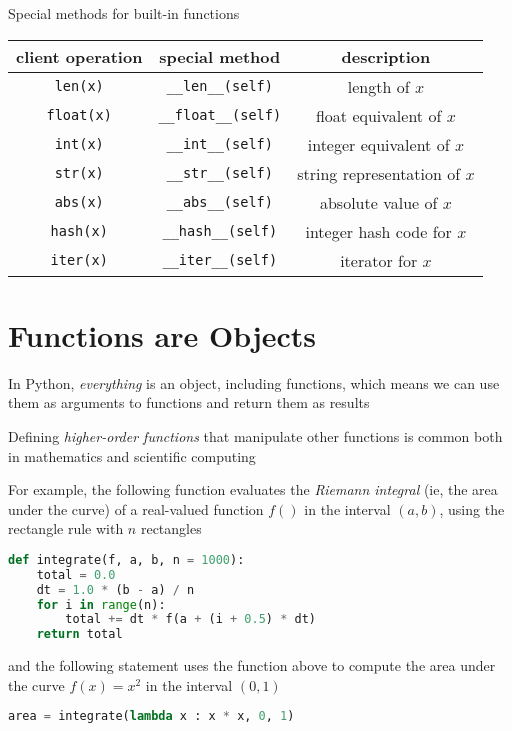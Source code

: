 \documentclass[8pt,a4paper,compress,handout]{beamer}
\begin{document}
\begin{frame}[fragile]
Special methods for built-in functions
\begin{center}
\begin{tabular}{ccc}
client operation & special method & description \\ \hline
\lstinline$len(x)$ & \lstinline$__len__(self)$ & length of $x$ \\
\lstinline$float(x)$ & \lstinline$__float__(self)$ & float equivalent of $x$ \\
\lstinline$int(x)$ & \lstinline$__int__(self)$ & integer equivalent of $x$ \\
\lstinline$str(x)$ & \lstinline$__str__(self)$ & string representation of $x$ \\
\lstinline$abs(x)$ & \lstinline$__abs__(self)$ & absolute value of $x$ \\
\lstinline$hash(x)$ & \lstinline$__hash__(self)$ & integer hash code for $x$ \\
\lstinline$iter(x)$ & \lstinline$__iter__(self)$ & iterator for $x$
\end{tabular} 
\end{center}
\end{frame}

\section{Functions are Objects}
\begin{frame}[fragile]
In Python, \emph{everything} is an object, including functions, which means we can use them as arguments to functions and return them as results

\bigskip

Defining \emph{higher-order functions} that manipulate other functions is common both in mathematics and scientific computing

\bigskip

For example, the following function evaluates the \emph{Riemann integral} (ie, the area under the curve) of a real-valued function $f()$ in the interval $(a, b)$, using the rectangle rule with $n$ rectangles

\begin{lstlisting}[language=Python]
def integrate(f, a, b, n = 1000):
    total = 0.0
    dt = 1.0 * (b - a) / n
    for i in range(n):
        total += dt * f(a + (i + 0.5) * dt)
    return total
\end{lstlisting}

and the following statement uses the function above to compute the area under the curve $f(x)=x^2$ in the interval $(0, 1)$

\begin{lstlisting}[language=Python]
area = integrate(lambda x : x * x, 0, 1)
\end{lstlisting}
\end{frame}
\end{document}
